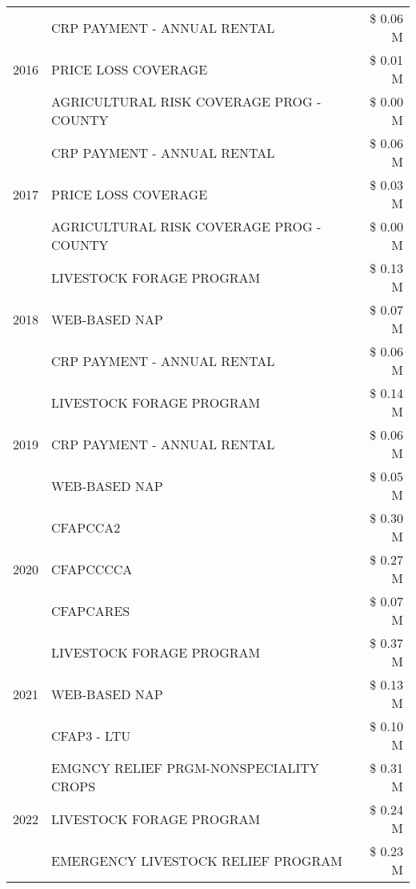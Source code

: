 \begin{tabular}{llr}
\multirow[t]{3}{*}{2016} & CRP PAYMENT - ANNUAL RENTAL & \$ 0.06 M \\
 & PRICE LOSS COVERAGE & \$ 0.01 M \\
 & AGRICULTURAL RISK COVERAGE PROG - COUNTY & \$ 0.00 M \\
\cline{1-3}
\multirow[t]{3}{*}{2017} & CRP PAYMENT - ANNUAL RENTAL & \$ 0.06 M \\
 & PRICE LOSS COVERAGE & \$ 0.03 M \\
 & AGRICULTURAL RISK COVERAGE PROG - COUNTY & \$ 0.00 M \\
\cline{1-3}
\multirow[t]{3}{*}{2018} & LIVESTOCK FORAGE PROGRAM & \$ 0.13 M \\
 & WEB-BASED NAP & \$ 0.07 M \\
 & CRP PAYMENT - ANNUAL RENTAL & \$ 0.06 M \\
\cline{1-3}
\multirow[t]{3}{*}{2019} & LIVESTOCK FORAGE PROGRAM & \$ 0.14 M \\
 & CRP PAYMENT - ANNUAL RENTAL & \$ 0.06 M \\
 & WEB-BASED NAP & \$ 0.05 M \\
\cline{1-3}
\multirow[t]{3}{*}{2020} & CFAPCCA2 & \$ 0.30 M \\
 & CFAPCCCCA & \$ 0.27 M \\
 & CFAPCARES & \$ 0.07 M \\
\cline{1-3}
\multirow[t]{3}{*}{2021} & LIVESTOCK FORAGE PROGRAM & \$ 0.37 M \\
 & WEB-BASED NAP & \$ 0.13 M \\
 & CFAP3 - LTU & \$ 0.10 M \\
\cline{1-3}
\multirow[t]{3}{*}{2022} & EMGNCY RELIEF PRGM-NONSPECIALITY CROPS & \$ 0.31 M \\
 & LIVESTOCK FORAGE PROGRAM & \$ 0.24 M \\
 & EMERGENCY LIVESTOCK RELIEF PROGRAM & \$ 0.23 M \\
\cline{1-3}
\bottomrule
\end{tabular}
